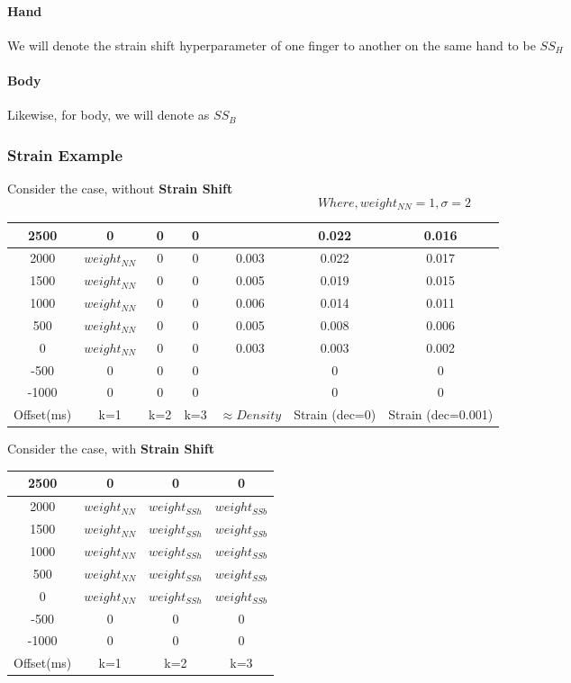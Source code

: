 \paragraph{Hand} We will denote the strain shift hyperparameter of one finger to another on the same hand to be $SS_H$
\paragraph{Body} Likewise, for body, we will denote as $SS_B$

\subsubsection{Strain Example}

Consider the case, without \textbf{Strain Shift}
$$ Where, weight_{NN} = 1, \sigma = 2 $$
\begin{center}
	\begin{tabular}{|c|c|c|c|c|c|c|} 
	\hline
	2500 & 0 			& 0 & 0 &       & 0.022 & 0.016\\ \hline
	2000 & $weight_{NN}$& 0 & 0 & 0.003 & 0.022 & 0.017\\	\hline
	1500 & $weight_{NN}$& 0 & 0 & 0.005 & 0.019 & 0.015\\	\hline
	1000 & $weight_{NN}$& 0 & 0 & 0.006 & 0.014 & 0.011\\	\hline
	 500 & $weight_{NN}$& 0 & 0 & 0.005 & 0.008 & 0.006\\	\hline
	   0 & $weight_{NN}$& 0 & 0 & 0.003 & 0.003 & 0.002\\	\hline
    -500 & 0 			& 0 & 0 & 		& 0	 	& 0	\\	\hline
   -1000 & 0 			& 0 & 0 & 		& 0	 	& 0	\\
	\hline
	Offset(ms) & k=1 & k=2 & k=3 & $\approx Density$ & Strain (dec=0) & Strain (dec=0.001) \\ 
	\hline
\end{tabular}
\end{center}

Consider the case, with \textbf{Strain Shift}
\begin{center}
	\begin{tabular}{|c|c|c|c|} 
	\hline
	2500 & 0			  & 0 		& 0 	\\ \hline
	2000 & $weight_{NN}$  & $weight_{SSh}$ 	& $weight_{SSb}$\\	\hline
	1500 & $weight_{NN}$  & $weight_{SSh}$ 	& $weight_{SSb}$\\	\hline
	1000 & $weight_{NN}$  & $weight_{SSh}$ 	& $weight_{SSb}$\\	\hline
	 500 & $weight_{NN}$  & $weight_{SSh}$ 	& $weight_{SSb}$\\	\hline
	   0 & $weight_{NN}$  & $weight_{SSh}$ 	& $weight_{SSb}$\\	\hline
    -500 & 0			  & 0 		& 0 	\\	\hline
   -1000 & 0			  & 0 		& 0 	\\
	\hline
	Offset(ms) & k=1 & k=2 & k=3\\ 
	\hline
\end{tabular}
\end{center}

